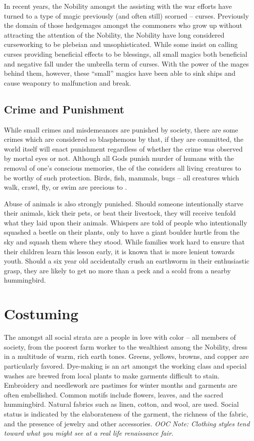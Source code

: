 \documentclass[blue]{GL2020}
\begin{document}
In recent years, the Nobility amongst the \pFarm{} assisting with the war efforts have turned to a type of magic previously (and often still) scorned -- curses.  Previously the domain of those hedgemages amongst the commoners who grow up without attracting the attention of the Nobility, the Nobility have long considered curseworking to be plebeian and unsophisticated.  While some insist on calling curses providing beneficial effects to be blessings, all small magics both beneficial and negative fall under the umbrella term of curses.  With the power of the \pFarm{} mages behind them, however, these ``small'' magics have been able to sink ships and cause \pShip{} weaponry to malfunction and break.

\subsection*{Crime and Punishment}
While small crimes and misdemeanors are punished by society, there are some crimes which are considered so blasphemous by \cFarmGod{} that, if they are committed, the world itself will enact punishment regardless of whether the crime was observed by mortal eyes or not.  Although all Gods punish murder of humans with the removal of one's conscious memories, the \cFarmGod{\God} of the \pFarm{} considers all living creatures to be worthy of such protection.  Birds, fish, mammals, bugs – all creatures which walk, crawl, fly, or swim are precious to \cFarmGod{}. 

Abuse of animals is also strongly punished.  Should someone intentionally starve their animals, kick their pets, or beat their livestock, they will receive tenfold what they laid upon their animals.  Whispers are told of people who intentionally squashed a beetle on their plants, only to have a giant boulder hurtle from the sky and squash them where they stood.  While families work hard to ensure that their children learn this lesson early, it is known that \cFarmGod{} is more lenient towards youth.  Should a six year old accidentally crush an earthworm in their enthusiastic grasp, they are likely to get no more than a peck and a scold from a nearby hummingbird. 

\section*{Costuming}
The \pFarm{} amongst all social strata are a people in love with color – all members of society, from the poorest farm worker to the wealthiest among the Nobility, dress in a multitude of warm, rich earth tones.  Greens, yellows, browns, and copper are particularly favored.  Dye-making is an art amongst the working class and special washes are brewed from local plants to make garments difficult to stain.  Embroidery and needlework are pastimes for winter months and garments are often embellished.  Common motifs include flowers, leaves, and the sacred hummingbird.  Natural fabrics such as linen, cotton, and wool, are used.  Social status is indicated by the elaborateness of the garment, the richness of the fabric, and the presence of jewelry and other accessories. \emph{OOC Note: Clothing styles tend toward what you might see at a real life renaissance fair.}
\end{document}

